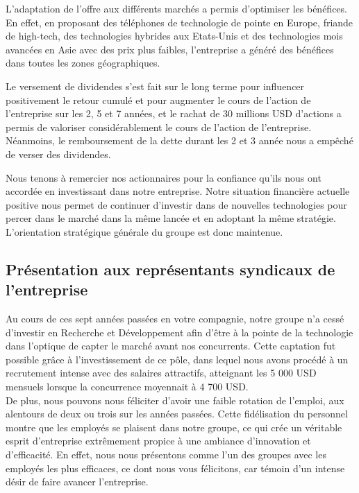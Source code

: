 \documentclass[a4paper,11pt]{article}
\theoremstyle{remark}
\begin{document}
		L’adaptation de l’offre aux différents marchés a permis d’optimiser les bénéfices.
		En effet, en proposant des téléphones de technologie de pointe en Europe, friande de high-tech, des technologies hybrides aux Etats-Unis et des technologies mois avancées en Asie avec des prix plus faibles, l’entreprise a généré des bénéfices dans toutes les zones géographiques. 
	
		Le versement de dividendes s’est fait sur le long terme pour influencer positivement le retour cumulé et pour augmenter le cours de l’action de l’entreprise sur les 2\up{e}, 5 et 7 années, et le rachat de 30 millions USD d’actions a permis de valoriser considérablement le cours de l’action de l’entreprise.
		Néanmoins, le remboursement de la dette durant les 2\up{e} et 3 année nous a empêché de verser des dividendes. 
	
		Nous tenons à remercier nos actionnaires pour la confiance qu’ils nous ont accordée en investissant dans notre entreprise.
		Notre situation financière actuelle positive nous permet de continuer d’investir dans de nouvelles technologies pour percer dans le marché dans la même lancée et en adoptant la même stratégie.
		L’orientation stratégique générale du groupe est donc maintenue.
	
	\subsection{Présentation aux représentants syndicaux de l’entreprise}
	
		Au cours de ces sept années passées en votre compagnie, notre groupe n'a cessé d'investir en Recherche et 	Développement afin d'être à la pointe de la technologie dans l'optique de capter le marché avant nos concurrents.
		Cette captation fut possible grâce à l'investissement de ce pôle, dans lequel nous avons procédé	à un recrutement intense avec des salaires attractifs, atteignant les 5 000 USD mensuels lorsque la concurrence moyennait à 4 700 USD.
		\mbox{}\\
 
		De plus, nous pouvons nous féliciter d'avoir une faible rotation de l'emploi, aux alentours de deux ou trois sur les années passées.
		Cette fidélisation du personnel montre que les employés se plaisent dans notre groupe, ce qui	crée un véritable esprit d'entreprise extrêmement propice à une ambiance d'innovation et d'efficacité.
		En effet, nous nous présentons comme l'un des groupes avec les employés les plus efficaces, ce dont nous vous félicitons, car témoin d'un intense désir de faire avancer l'entreprise.
		\mbox{}\\
		 
\end{document}

